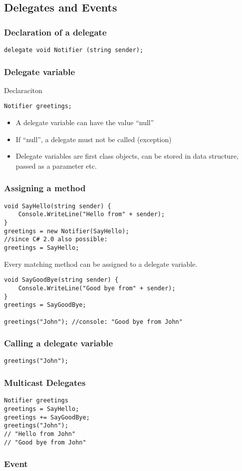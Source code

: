 \subsection{Delegates and Events}
\subsubsection{Declaration of a delegate}
\begin{lstlisting}
delegate void Notifier (string sender);
\end{lstlisting}

\subsubsection{Delegate variable}
Declaraciton
\begin{lstlisting}
Notifier greetings;
\end{lstlisting}
\begin{itemize}
  \item A delegate variable can have the value "`null"'
  \item If "`null"', a delegate must not be called (exception)
  \item Delegate variables are first class objects, can be stored in data
  structure, passed as a parameter etc.
\end{itemize}

\subsubsection{Assigning a method}
\begin{lstlisting}
void SayHello(string sender) {
	Console.WriteLine("Hello from" + sender);
}
greetings = new Notifier(SayHello);
//since C# 2.0 also possible:
greetings = SayHello;
\end{lstlisting}
Every matching method can be assigned to a delegate variable.
\begin{lstlisting}
void SayGoodBye(string sender) {
	Console.WriteLine("Good bye from" + sender);
}
greetings = SayGoodBye;

greetings("John"); //console: "Good bye from John"
\end{lstlisting}

\subsubsection{Calling a delegate variable}
\begin{lstlisting}
greetings("John");
\end{lstlisting}

\subsubsection{Multicast Delegates}
\begin{lstlisting}
Notifier greetings
greetings = SayHello;
greetings += SayGoodBye;
greetings("John");
// "Hello from John"
// "Good bye from John"
\end{lstlisting}

\subsubsection{Event}